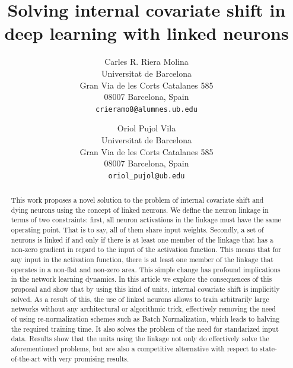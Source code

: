 \documentclass[10pt,twocolumn,letterpaper]{article}
\begin{document}
\title{Solving internal covariate shift in deep learning with linked neurons}

\author{Carles R. Riera Molina\\
    Universitat de Barcelona\\
    Gran Via de les Corts Catalanes 585\\
    08007 Barcelona, Spain\\
    {\tt\small crieramo8@alumnes.ub.edu}
    \and
    Oriol Pujol Vila\\
    Universitat de Barcelona\\
    Gran Via de les Corts Catalanes 585\\
    08007 Barcelona, Spain\\
    {\tt\small oriol\_pujol@ub.edu}
}

\maketitle

\begin{abstract}
    This work proposes a novel solution to the problem of internal covariate shift and dying neurons using the concept of linked neurons. We define the neuron linkage in terms of two constraints: first, all neuron activations in the linkage must have the same operating point. That is to say, all of them share input weights. Secondly, a set of neurons is linked if and only if there is at least one member of the linkage that has a non-zero gradient in regard to the input of the activation function. This means that for any input in the activation function, there is at least one member of the linkage that operates in a non-flat and non-zero area. This simple change has profound implications in the network learning dynamics. In this article we explore the consequences of this proposal and show that by using this kind of units, internal covariate shift is implicitly solved. As a result of this, the use of linked neurons allows to train arbitrarily large networks without any architectural or algorithmic trick, effectively removing the need of using re-normalization schemes such as Batch Normalization, which leads to halving the required training time. It also solves the problem of the need for standarized input data. Results show that the units using the linkage not only do effectively solve the aforementioned problems, but are also a competitive alternative with respect to state-of-the-art with very promising results.
\end{abstract}
\end{document}
